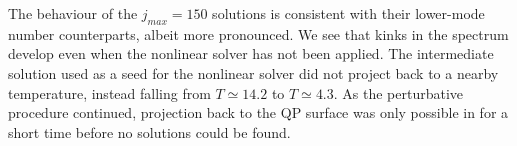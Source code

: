 \documentclass[../PhD.tex]{subfiles}
\begin{document}
\begin{subappendices}
The behaviour of the $j_{max}=150$ solutions is consistent with their lower-mode number counterparts, albeit more pronounced. We see that kinks in the spectrum develop even when the nonlinear solver has not been applied. The intermediate solution used as a seed for the nonlinear solver did not project back to a nearby temperature, instead falling from $T \simeq 14.2$ to $T \simeq 4.3$. As the perturbative procedure continued, projection back to the QP surface was only possible in for a short time before no solutions could be found. 

\end{subappendices}

\end{document}
